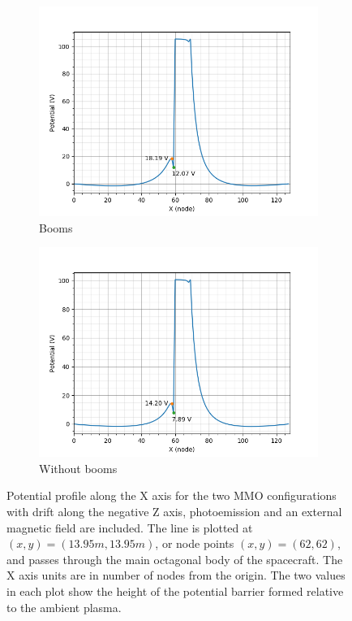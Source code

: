 
\begin{figure}[H]
  \begin{subfigure}[b]{0.6\textwidth}
  \includegraphics[width=\textwidth]{figures/MMO/BField/WB/L_BField_WB.png}
  \caption{Booms}
  \label{fig:L_BField_WB}
\end{subfigure}
\begin{subfigure}[b]{0.6\textwidth}
  \includegraphics[width=\textwidth]{figures/MMO/BField/NB/L_BField_NB.png}
  \caption{Without booms}
  \label{fig:L_BField_NB}
\end{subfigure}
\label{fig:Line_BField}
\caption{Potential profile along the X axis for the two MMO configurations with drift along the negative Z axis, photoemission and an external magnetic field are included. The line is plotted at $(x,y) = (13.95 m, 13.95 m)$, or node points $(x,y) = (62,62)$, and passes through the main octagonal body of the spacecraft. The X axis units are in number of nodes from the origin. The two values in each plot show the height of the potential barrier formed relative to the ambient plasma.}
\end{figure}

